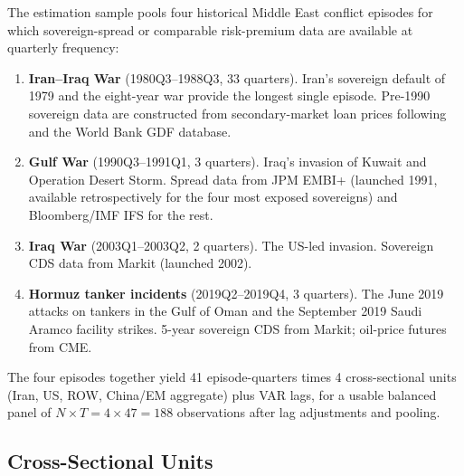 \documentclass[12pt]{article}
\begin{document}
The estimation sample pools four historical Middle East conflict episodes for which sovereign-spread or comparable risk-premium data are available at quarterly frequency:
\begin{enumerate}[itemsep=2pt, topsep=2pt]
    \item \textbf{Iran--Iraq War} (1980Q3--1988Q3, 33 quarters). Iran's sovereign default of 1979 and the eight-year war provide the longest single episode. Pre-1990 sovereign data are constructed from secondary-market loan prices following \citet{borensztein2013debt} and the World Bank GDF database.
    \item \textbf{Gulf War} (1990Q3--1991Q1, 3 quarters). Iraq's invasion of Kuwait and Operation Desert Storm. Spread data from JPM EMBI+ (launched 1991, available retrospectively for the four most exposed sovereigns) and Bloomberg/IMF IFS for the rest.
    \item \textbf{Iraq War} (2003Q1--2003Q2, 2 quarters). The US-led invasion. Sovereign CDS data from Markit (launched 2002).
    \item \textbf{Hormuz tanker incidents} (2019Q2--2019Q4, 3 quarters). The June 2019 attacks on tankers in the Gulf of Oman and the September 2019 Saudi Aramco facility strikes. 5-year sovereign CDS from Markit; oil-price futures from CME.
\end{enumerate}
The four episodes together yield 41 episode-quarters times 4 cross-sectional units (Iran, US, ROW, China/EM aggregate) plus VAR lags, for a usable balanced panel of $N \times T = 4 \times 47 = 188$ observations after lag adjustments and pooling.

\subsection{Cross-Sectional Units}
\end{document}
